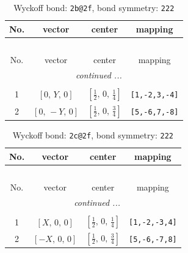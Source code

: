 \documentclass[fleqn,8pt]{jsarticle}
\begin{document}
\renewcommand{\arraystretch}{1.2}
\begin{longtable}{cccc}
\caption{Wyckoff bond: {\tt 2b@2f}, bond symmetry: {\tt 222}}
 \\
 \hline \hline
No. & vector & center & mapping \\ \hline \endfirsthead

\multicolumn{3}{l}{\tablename\ \thetable{}} \\
 \hline \hline
No. & vector & center & mapping \\ \hline \endhead

 \hline \hline
\multicolumn{3}{r}{\footnotesize\it continued ...} \\ \endfoot

 \hline \hline
\multicolumn{3}{r}{} \\ \endlastfoot

1 & $\left[ 0,\, Y,\, 0 \right]$ & $\left[ \frac{1}{2},\, 0,\, \frac{1}{4} \right]$ & {\tt [1,-2,3,-4]} \\ \hline
2 & $\left[ 0,\, - Y,\, 0 \right]$ & $\left[ \frac{1}{2},\, 0,\, \frac{3}{4} \right]$ & {\tt [5,-6,7,-8]} \\
\end{longtable}
\renewcommand{\arraystretch}{1.2}
\begin{longtable}{cccc}
\caption{Wyckoff bond: {\tt 2c@2f}, bond symmetry: {\tt 222}}
 \\
 \hline \hline
No. & vector & center & mapping \\ \hline \endfirsthead

\multicolumn{3}{l}{\tablename\ \thetable{}} \\
 \hline \hline
No. & vector & center & mapping \\ \hline \endhead

 \hline \hline
\multicolumn{3}{r}{\footnotesize\it continued ...} \\ \endfoot

 \hline \hline
\multicolumn{3}{r}{} \\ \endlastfoot

1 & $\left[ X,\, 0,\, 0 \right]$ & $\left[ \frac{1}{2},\, 0,\, \frac{1}{4} \right]$ & {\tt [1,-2,-3,4]} \\ \hline
2 & $\left[ - X,\, 0,\, 0 \right]$ & $\left[ \frac{1}{2},\, 0,\, \frac{3}{4} \right]$ & {\tt [5,-6,-7,8]} \\
\end{longtable}
\renewcommand{\arraystretch}{1.2}
\end{document}
